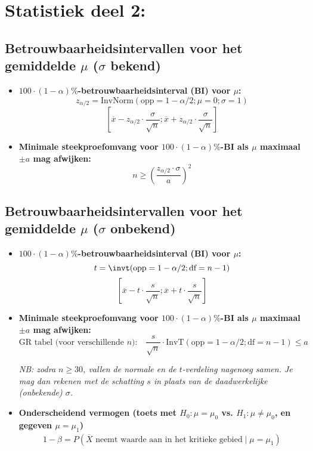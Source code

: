 \section*{Statistiek deel 2:}

\subsection*{Betrouwbaarheidsintervallen voor het gemiddelde $\mu$ ($\sigma$ bekend)}
    \begin{itemize}
        \item \textbf{\boldmath$100\cdot(1-\alpha)\%$-betrouwbaarheidsinterval (BI) voor \boldmath$\mu$:}
        \[
            z_{\alpha/2} = \text{InvNorm}(\text{opp}=1-\alpha/2; \mu=0; \sigma=1)
        \]
        \[
            [\overline{x} - z_{\alpha/2} \cdot \frac{\sigma}{\sqrt{n}}; \overline{x} + z_{\alpha/2} \cdot \frac{\sigma}{\sqrt{n}}]
        \]

        \item \textbf{Minimale steekproefomvang voor \boldmath$100\cdot(1-\alpha)\%$-BI als \boldmath$\mu$ maximaal \boldmath$\pm a$ mag afwijken:}
        \[
            n \ge \left( \frac{z_{\alpha/2} \cdot \sigma}{a} \right)^2
        \]
    \end{itemize}

\subsection*{Betrouwbaarheidsintervallen voor het gemiddelde $\mu$ ($\sigma$ onbekend)}
    \begin{itemize}
        \item \textbf{\boldmath$100\cdot(1-\alpha)\%$-betrouwbaarheidsinterval (BI) voor \boldmath$\mu$:}
            \[
                t = \invt(\text{opp}=1-\alpha/2; \text{df}=n-1)
            \]
            \[
                [\overline{x} - t \cdot \frac{s}{\sqrt{n}}; \overline{x} + t \cdot \frac{s}{\sqrt{n}}]
            \]

        \item \textbf{Minimale steekproefomvang voor $100\cdot(1-\alpha)\%$-BI als $\mu$ maximaal \boldmath$\pm a$ mag afwijken:}
            \[
                \text{GR tabel (voor verschillende $n$):} \quad \frac{s}{\sqrt{n}} \cdot \text{InvT}(\text{opp}=1-\alpha/2; \text{df}=n-1) \le a
            \]
            
            {\itshape NB: zodra $n \ge 30$, vallen de normale en de $t$-verdeling nagenoeg samen. Je mag dan rekenen met de schatting $s$ in plaats van de daadwerkelijke (onbekende) $\sigma$.}
    

    \item {\bfseries Onderscheidend vermogen (toets met $H_0: \mu=\mu_0$ vs. $H_1: \mu \neq \mu_0$, en gegeven $\mu = \mu_1$)}
        \begin{align*}
            1 - \beta = P(\overline{X} \text{ neemt waarde aan in het kritieke gebied} \mid \mu = \mu_1)
        \end{align*}
    \end{itemize}
